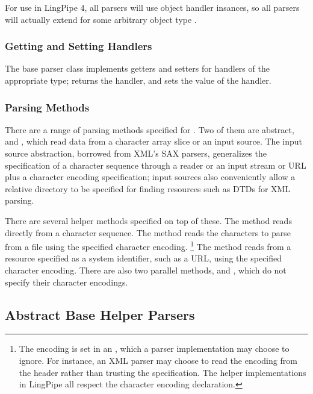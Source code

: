 For use in LingPipe 4, all parsers will use object handler insances,
so all parsers will actually extend 
for some arbitrary object type .

\subsubsection{Getting and Setting Handlers}

The base parser class implements getters and setters for 
handlers of the appropriate type; 
returns the handler, and  sets the
value of the handler.

\subsubsection{Parsing Methods}

There are a range of parsing methods specified for .  Two
of them are abstract,  and
, which read data from a character array
slice or an input source.  The input source abstraction, borrowed from
XML's SAX parsers, generalizes the specification of a character
sequence through a reader or an input stream or URL plus a character
encoding specification; input sources also conveniently allow a
relative directory to be specified for finding resources such as DTDs
for XML parsing.

There are several helper methods specified on top of these.  The
method  reads directly from a character
sequence.  The  method reads the characters
to parse from a file using the specified character encoding.%
%
\footnote{The encoding is set in an , which a parser
  implementation may choose to ignore.  For instance, an XML parser
  may choose to read the encoding from the header rather than trusting
  the specification.  The helper implementations in LingPipe all
  respect the character encoding declaration.}
%
The method  reads from a resource specified
as a system identifier, such as a URL, using the specified character
encoding.  There are also two parallel methods,  and
, which do not specify their character encodings.


\subsection{Abstract Base Helper Parsers}


